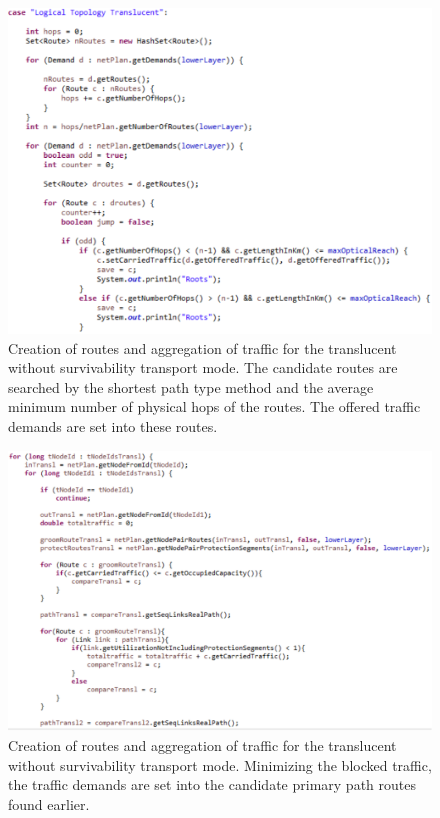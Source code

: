 \begin{figure}[H]
\centering
\includegraphics[width=17cm]{sdf/heuristic/translucent_survivability/figures/grooming_translucent_surv1}
\caption{Creation of routes and aggregation of traffic for the translucent without survivability transport mode. The candidate routes are searched by the shortest path type method and the average minimum number of physical hops of the routes. The offered traffic demands are set into these routes.}
\label{grooming_translucent_surv1}
\end{figure}

\begin{figure}[H]
\centering
\includegraphics[width=15cm]{sdf/heuristic/translucent_survivability/figures/grooming_translucent_surv2}
\caption{Creation of routes and aggregation of traffic for the translucent without survivability transport mode. Minimizing the blocked traffic, the traffic demands are set into the candidate primary path routes found earlier.}
\label{grooming_translucent_surv2}
\end{figure}

